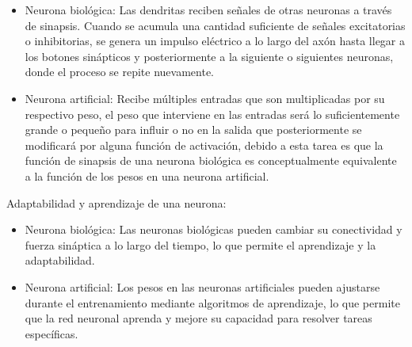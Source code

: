 \begin{itemize}
	\item	 Neurona biológica: Las dendritas reciben señales de otras neuronas a través de sinapsis. Cuando se acumula una cantidad suficiente de señales excitatorias o inhibitorias, se genera un impulso eléctrico a lo largo del axón hasta llegar a los botones sinápticos y posteriormente a la siguiente o siguientes neuronas, donde el proceso se repite nuevamente.
	\item	Neurona artificial: Recibe múltiples entradas que son multiplicadas por su respectivo peso, el peso que interviene en las entradas será lo suficientemente grande o pequeño para influir o no en la salida que posteriormente se modificará por alguna función de activación, debido a esta tarea es que la función de sinapsis de una neurona biológica es conceptualmente equivalente a la función de los pesos en una neurona artificial. 
\end{itemize}

\begin{itemize}
Adaptabilidad y aprendizaje de una neurona:
\end{itemize}

\begin{itemize}
	\item	 Neurona biológica: Las neuronas biológicas pueden cambiar su conectividad y fuerza sináptica a lo largo del tiempo, lo que permite el aprendizaje y la adaptabilidad.
	\item	Neurona artificial: Los pesos en las neuronas artificiales pueden ajustarse durante el entrenamiento mediante algoritmos de aprendizaje, lo que permite que la red neuronal aprenda y mejore su capacidad para resolver tareas específicas.
\end{itemize}

